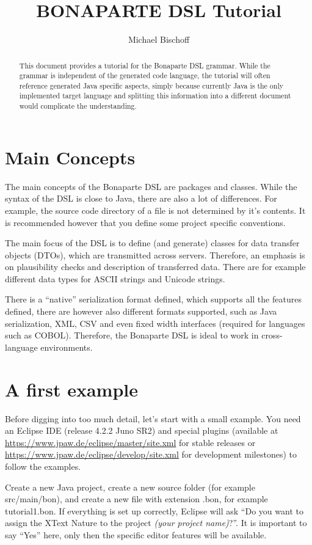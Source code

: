 \documentclass[11pt,a4paper,oneside]{article}
\title{BONAPARTE DSL Tutorial}
\author{Michael Bischoff}
\begin{document}
\maketitle
\begin{abstract}
This document provides a tutorial for the Bonaparte DSL grammar. While the grammar is independent of the generated code language,
the tutorial will often reference generated Java specific aspects, simply because currently Java is the only implemented target language
and splitting this information into a different document would complicate the understanding.
\end{abstract}

\section{Main Concepts}
The main concepts of the Bonaparte DSL are packages and classes. While the syntax of the DSL is close to Java, there are also a lot of differences.
For example, the source code directory of a file is not determined by it's contents. It is recommended however that you define some project specific
conventions.

The main focus of the DSL is to define (and generate) classes for data transfer objects (DTOs), which are transmitted across servers.
Therefore, an emphasis is on plausibility checks and description of transferred data. There are for example different data types for ASCII strings
and Unicode strings.

There is a ``native'' serialization format defined, which supports all the features defined, there are however also different formats supported,
such as Java serialization, XML, CSV and even fixed width interfaces (required for languages such as COBOL). Therefore, the Bonaparte DSL
is ideal to work in cross-language environments.


\section{A first example}
Before digging into too much detail, let's start with a small example.  You need an Eclipse IDE (release 4.2.2 Juno SR2) and
special plugins (available at \url{https://www.jpaw.de/eclipse/master/site.xml} for stable releases or
\url{https://www.jpaw.de/eclipse/develop/site.xml} for development milestones) to follow the examples.

Create a new Java project, create a new source folder (for example {\ttfamily src/main/bon}), and create a new file with extension {\ttfamily .bon},
for example {\ttfamily tutorial1.bon}. If everything is set up correctly, Eclipse will ask ``Do you want to assign the XText
Nature to the project {\it{ (your project name)}}?''.
It is important to say ``Yes'' here, only then the specific editor features will be available.
\end{document}
